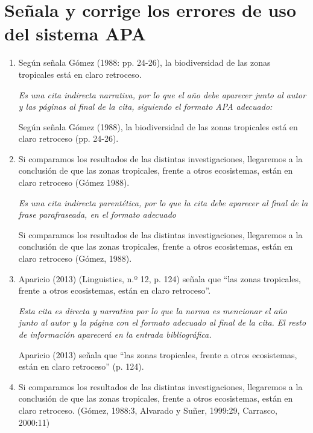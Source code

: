 \documentclass[12pt, a4paper, oneside]{report}
\begin{document}
        \section{Señala y corrige los errores de uso del sistema APA}
        \begin{Large}
            \renewcommand{\labelenumi}{\alph{enumi})}
            \begin{enumerate}
                \item Según señala Gómez (1988: pp. 24-26), la biodiversidad de las zonas tropicales está en
                claro retroceso.

                \textit{Es una cita indirecta narrativa, por lo que el año debe aparecer junto al autor y las
                páginas al final de la cita, siguiendo el formato APA adecuado:}

                Según señala Gómez (1988), la biodiversidad de las zonas tropicales está en claro retroceso
                (pp. 24-26).
                \clearpage

                \item Si comparamos los resultados de las distintas investigaciones, llegaremos a la
                conclusión de que las zonas tropicales, frente a otros ecosistemas, están en claro retroceso
                (Gómez 1988).

                \textit{Es una cita indirecta parentética, por lo que la cita debe aparecer al final de la
                frase parafraseada, en el formato adecuado}

                Si comparamos los resultados de las distintas investigaciones, llegaremos a la conclusión de
                que las zonas tropicales, frente a otros ecosistemas, están en claro retroceso (Gómez, 1988).
                \item Aparicio (2013) (Linguistics, n.º 12, p. 124) señala que ``las zonas tropicales, frente
                a otros ecosistemas, están en claro retroceso''.

                \textit{Esta cita es directa y narrativa por lo que la norma es mencionar el año junto al
                autor y la página con el formato adecuado al final de la cita. El resto de información
                aparecerá en la entrada bibliográfica.}

                Aparicio (2013) señala que “las zonas tropicales, frente a otros ecosistemas, están en claro
                retroceso” (p. 124).
                \clearpage
                \item Si comparamos los resultados de las distintas investigaciones, llegaremos a la
                conclusión de que las zonas tropicales, frente a otros ecosistemas, están en claro retroceso.
                (Gómez, 1988:3, Alvarado y Suñer, 1999:29, Carrasco, 2000:11)


\end{enumerate}
\end{Large}
\end{document}
